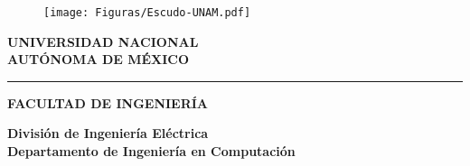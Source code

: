 \documentclass[10pt,openany]{book}
\begin{document}
\begin{titlepage}
\thispagestyle{empty}
\noindent
\begin{minipage}[c]{0.25\textwidth}%

\begin{figure}[H]
\texttt{[image: Figuras/Escudo-UNAM.pdf]}
\end{figure}
\end{minipage}\hfill\begin{minipage}[c]{0.75\textwidth}%
\begin{center}
\textbf{\Huge {UNIVERSIDAD NACIONAL\\[2mm]
AUTÓNOMA DE MÉXICO}}\vspace{5mm}
\hrule height 2.5pt \vspace{5mm}
\textbf{\Huge {FACULTAD DE INGENIERÍA}}
\end{center}
\end{minipage}

\noindent
\begin{minipage}[t]{0.25\textwidth}%
\vspace{5mm}
\hspace{0.9cm}
\vrule width2.5pt height13cm
\hspace{8mm}
\vrule width2.5pt height13cm
\end{minipage}\hfill\begin{minipage}[t]{0.75\textwidth}%

\begin{center}
\vspace{1cm}
\textbf{\huge {División de Ingeniería Eléctrica\\[2mm]
Departamento de Ingeniería en Computación}}\\[1.5cm]


\end{center}
\end{minipage}
\end{titlepage}
\end{document}
